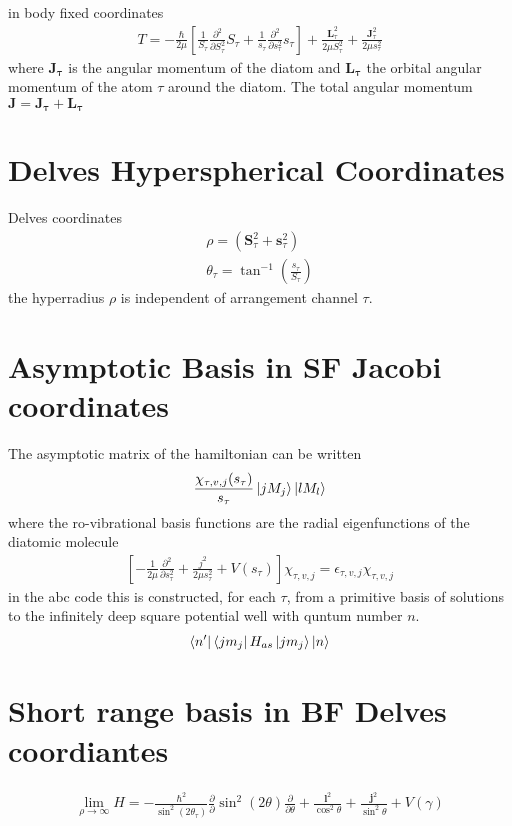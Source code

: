 \documentclass[aps,pra,onecolumn,showpacs,floatfix]{revtex4}
\begin{document}
in body fixed coordinates
\begin{align}\label{eqn:ms_jac}
	T = -\frac{\hbar}{2\mu}\left[\frac{1}{S_\tau}\frac{\partial^2}{\partial S^2_\tau}S_\tau + \frac{1}{s_\tau}\frac{\partial^2}{\partial s^2_\tau}s_\tau\right] +
	\frac{\mathbf{L}^2_\tau}{2\mu S^2_\tau} + \frac{\mathbf{J}^2_\tau}{2\mu s^2_\tau}
\end{align}
where $\mathbf{J_\tau}$ is the angular momentum of the diatom  and
$\mathbf{L_\tau}$ the orbital angular momentum of the atom $\tau$ around the
diatom. The total angular momentum $\mathbf{J}=\mathbf{J_\tau}+\mathbf{L_\tau}$

\section{Delves Hyperspherical Coordinates}
Delves coordinates\cite{Delves:1958,Delves:1960}
\begin{align}\label{eqn:delves}
	\rho = (\mathbf{S}^2_\tau + \mathbf{s}^2_\tau ) \\
	\theta_\tau = \tan^{-1}({\frac{s_\tau}{S_\tau}})
\end{align}
the hyperradius $\rho$ is independent of arrangement channel $\tau$.

\section{Asymptotic Basis in SF Jacobi coordinates}
The asymptotic matrix of the hamiltonian can be written
\begin{align}\label{eqn:abasis_sf}
	\frac{\chi_{\tau,v,j}(s_\tau)}{s_\tau}\ket{jM_j}\ket{lM_l}
\end{align}
where the ro-vibrational basis functions are the radial eigenfunctions of the
diatomic molecule
\begin{align}\label{eqn:delves}
\left[-\frac{1}{2\mu}\frac{\partial^2}{\partial s_\tau^2} + \frac{j^2}{2\mu s_\tau^2} + V(s_\tau)\right]\chi_{\tau,v,j}= \epsilon_{\tau,v,j}\chi_{\tau,v,j}
\end{align}
in the abc code this is constructed, for each $\tau$, from a primitive basis of solutions to the
infinitely deep square potential well with quntum number $n$.
\begin{align}\label{eqn:delves}
	\bra{n'}\bra{jm_j}H_{as}\ket{jm_j}\ket{n}
\end{align}


\section{Short range basis in BF Delves coordiantes}
\begin{align}\label{eqn:delves}
	\lim_{\rho \to \infty}
	H = -\frac{\hbar^2}{\sin^2(2\theta_\tau)}\frac{\partial}{\partial}\sin^2(2\theta)\frac{\partial}{\partial\theta} + \frac{\mathbf{l}^2}{\cos^2\theta}+ \frac{\mathbf{j}^2}{\sin^2\theta} + V(\gamma)
\end{align}
\end{document}
